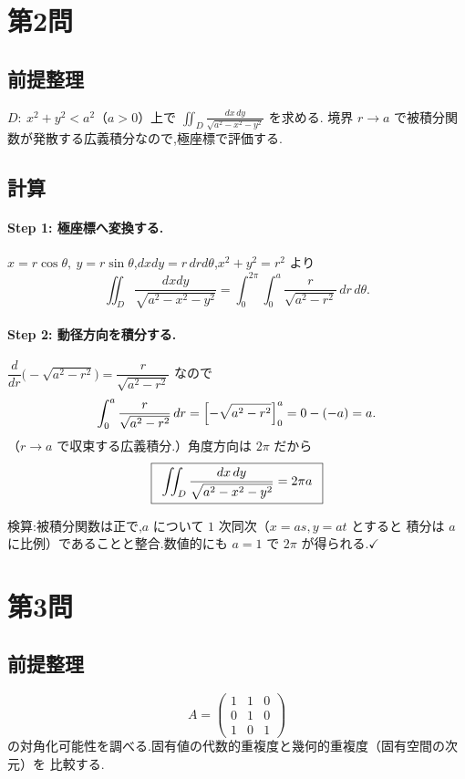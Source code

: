 \documentclass[11pt,a4paper]{article}
\begin{document}
\section*{第2問}

\subsection*{前提整理}

$D:\ x^2+y^2<a^2$（$a>0$）上で
$\displaystyle\iint_D\frac{dx\,dy}{\sqrt{a^2-x^2-y^2}}$ を求める.
境界 $r\to a$ で被積分関数が発散する広義積分なので,極座標で評価する.

\subsection*{計算}

\paragraph{Step 1: 極座標へ変換する.}
$x=r\cos\theta,\ y=r\sin\theta$,$dxdy=r\,drd\theta$,$x^2+y^2=r^2$ より
\[
\iint_D\frac{dxdy}{\sqrt{a^2-x^2-y^2}}
=\int_0^{2\pi}\!\!\int_0^{a}\frac{r}{\sqrt{a^2-r^2}}\,dr\,d\theta.
\]

\paragraph{Step 2: 動径方向を積分する.}
$\dfrac{d}{dr}\bigl(-\sqrt{a^2-r^2}\bigr)=\dfrac{r}{\sqrt{a^2-r^2}}$ なので
\[
\int_0^{a}\frac{r}{\sqrt{a^2-r^2}}\,dr
=\Bigl[-\sqrt{a^2-r^2}\Bigr]_0^{a}=0-(-a)=a.
\]
（$r\to a$ で収束する広義積分.）角度方向は $2\pi$ だから
\[
\boxed{\,\
\iint_D\frac{dx\,dy}{\sqrt{a^2-x^2-y^2}}=2\pi a\ \,}
\]

検算:被積分関数は正で,$a$ について $1$ 次同次（$x=as,y=at$ とすると
積分は $a$ に比例）であることと整合.数値的にも $a=1$ で $2\pi$ が得られる.$\checkmark$

\section*{第3問}

\subsection*{前提整理}

\[
A=\begin{pmatrix}1&1&0\\0&1&0\\1&0&1\end{pmatrix}
\]
の対角化可能性を調べる.固有値の代数的重複度と幾何的重複度（固有空間の次元）を
比較する.
\end{document}

